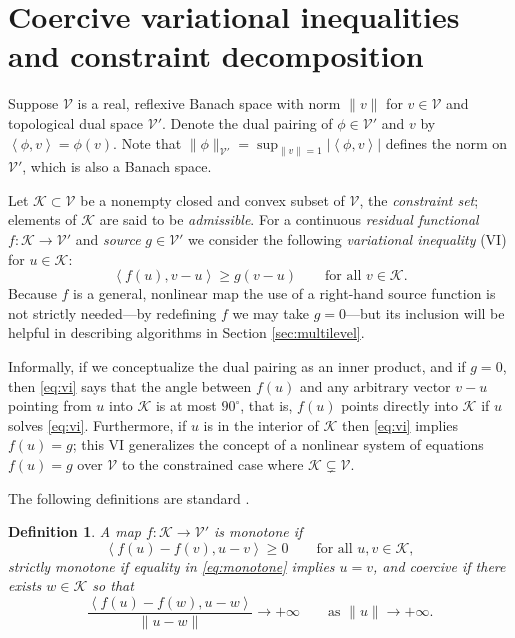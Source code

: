 \documentclass[letterpaper,final,12pt,reqno]{amsart}
\theoremstyle{cstyle}
\theoremstyle{dstyle}
\newtheorem{definition}[theorem]{Definition}
\numberwithin{equation}{section}
\numberwithin{figure}{section}
\numberwithin{table}{section}
\numberwithin{theorem}{section}
\newcommand{\cK}{\mathcal{K}}
\newcommand{\cV}{\mathcal{V}}
\newcommand{\ip}[2]{\left<#1,#2\right>}
\begin{document}
\section{Coercive variational inequalities and constraint decomposition} \label{sec:vi}

Suppose $\cV$ is a real, reflexive Banach space with norm $\|v\|$ for $v\in\cV$ and topological dual space $\cV'$.  Denote the dual pairing of $\phi \in \cV'$ and $v$ by $\ip{\phi}{v} = \phi(v)$.  Note that $\|\phi\|_{\cV'} = \sup_{\|v\|=1} |\ip{\phi}{v}|$ defines the norm on $\cV'$, which is also a Banach space.

Let $\cK \subset \cV$ be a nonempty closed and convex subset of $\cV$, the \emph{constraint set}; elements of $\cK$ are said to be \emph{admissible}.  For a continuous \emph{residual functional} $f:\cK \to \cV'$ and \emph{source} $g\in \cV'$ we consider the following \emph{variational inequality} (VI) for $u\in \cK$:
\begin{equation}
\ip{f(u)}{v-u} \ge g(v-u) \qquad \text{for all } v\in \cK. \label{eq:vi}
\end{equation}
Because $f$ is a general, nonlinear map the use of a right-hand source function is not strictly needed---by redefining $f$ we may take $g=0$---but its inclusion will be helpful in describing algorithms in Section \ref{sec:multilevel}.

Informally, if we conceptualize the dual pairing as an inner product, and if $g=0$, then \eqref{eq:vi} says that the angle between $f(u)$ and any arbitrary vector $v-u$ pointing from $u$ into $\cK$ is at most $90^\circ$, that is, $f(u)$ points directly into $\cK$ if $u$ solves \eqref{eq:vi}.  Furthermore, if $u$ is in the interior of $\cK$ then \eqref{eq:vi} implies $f(u)=g$; this VI generalizes the concept of a nonlinear system of equations $f(u)=g$ over $\cV$ to the constrained case where $\cK \subsetneq \cV$.

The following definitions are standard \cite{KinderlehrerStampacchia1980}.

\begin{definition} A map $f:\cK \to \cV'$ is \emph{monotone} if
\begin{equation}
\ip{f(u)-f(v)}{u-v} \ge 0 \qquad \text{for all } u,v \in \cK, \label{eq:monotone}
\end{equation}
\emph{strictly monotone} if equality in \eqref{eq:monotone} implies $u=v$, and \emph{coercive} if there exists $w \in \cK$ so that
\begin{equation}
\frac{\ip{f(u)-f(w)}{u-w}}{\|u-w\|} \to +\infty \qquad \text{as } \|u\|\to +\infty. \label{eq:coercive}
\end{equation}
\end{definition}
\end{document}
